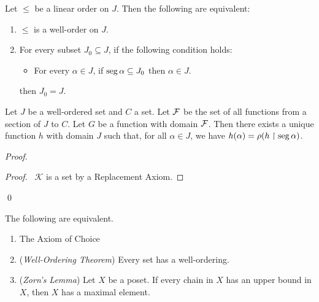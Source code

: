 \begin{theorem}
    Let $\leq$ be a linear order on $J$. Then the following are equivalent:
    \begin{enumerate}
        \item $\leq$ is a well-order on $J$.
        \item For every subset $J_0 \subseteq J$, if the following condition holds:
        \begin{itemize}
            \item For every $\alpha \in J$, if $\operatorname{seg} \alpha \subseteq J_0$ then $\alpha \in J$.
        \end{itemize}
        then $J_0 = J$.
    \end{enumerate}
\end{theorem}

\begin{theorem}
    Let $J$ be a well-ordered set and $C$ a set. Let $\mathcal{F}$ be the set of all functions from a section of $J$ to $C$.
    Let $G$ be a function with domain $\mathcal{F}$. Then there exists a unique function $h$ with domain $J$
    such that, for all $\alpha \in J$,
    we have $h(\alpha) = \rho(h \restriction \operatorname{seg} \alpha)$.
\end{theorem}

\begin{proof}
    \pf
    \begin{proof}
        \pf\ $\mathcal{K}$ is a set by a Replacement Axiom.
    \end{proof}
    \qed
\end{proof}

\begin{theorem}
    The following are equivalent.
    \begin{enumerate}
        \item The Axiom of Choice
        \item (\emph{Well-Ordering Theorem}) Every set has a well-ordering.
        \item (\emph{Zorn's Lemma}) Let $X$ be a poset. If every chain in $X$ has 
        an upper bound in $X$, then $X$ has a maximal element.
    \end{enumerate}
\end{theorem}

